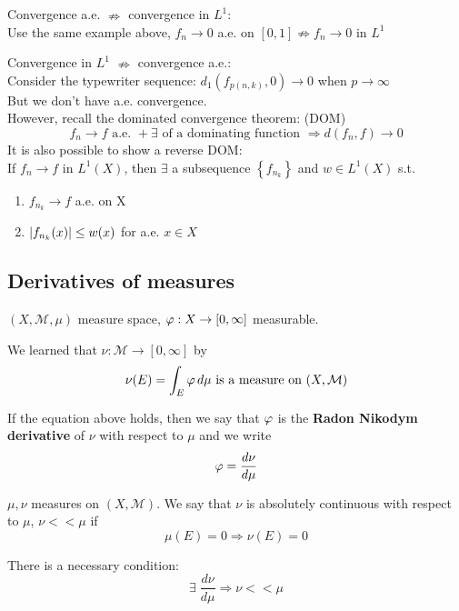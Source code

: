 Convergence a.e. \(\nRightarrow\) convergence in \(L^1\): \\
Use the same example above, \(f_n \rightarrow 0\) a.e. on \([0, 1] \nRightarrow f_n \rightarrow 0\) in \(L^1\)

Convergence in \(L^1\) \(\nRightarrow\) convergence a.e.: \\
Consider the typewriter sequence: \( d_1(f_{p(n, k)}, 0) \to 0\) when \( p \to\infty\) \\
But we don't have a.e. convergence. \\
However, recall the dominated convergence theorem: (DOM)
\[ 
    f_n \rightarrow f \text{ a.e. } + \exists \text{ of a dominating function } \Rightarrow d(f_n, f)\rightarrow 0 
\]
It is also possible to show a reverse DOM: \\
If \(f_n \to f \) in \(L^1(X)\), then \(\exists\) a subsequence \(\left\{f_{n_k}\right\}\) and \(w \in L^1(X)\) s.t. 
\begin{enumerate}
    \item \(f_{n_k} \rightarrow f\) a.e. on X
    \item \( \abs{f_{n_k}(x)} \leq w(x) \) for a.e. \(x \in X\)
\end{enumerate}

\subsection*{Derivatives of measures}
\(\left(X, \mathcal{M}, \mu \right)\) measure space,
\(\oldphi : X \to \left[0, \infty \right]\) measurable.  

We learned that \(\nu: \mathcal{M} \to \left[0, \infty \right]\) by 
\[
    \nu(E)= \int_E \oldphi \, d\mu \mbox{ is a measure on }(X, \mathcal{M})
\] 

If the equation above holds, then we say that \(\oldphi\) is the \textbf{Radon Nikodym derivative} of \(\nu\) with respect to \(\mu\) and we write 
\[
    \oldphi = \frac{d\nu}{d\mu}
\]
\begin{definition}
    \(\mu, \nu  \) measures on \(\left(X, \mathcal{M}\right)\). 
    We say that \(\nu\) is absolutely continuous with respect to \(\mu\), \(\nu << \mu \) if 
    \[
        \mu(E) = 0 \Rightarrow \nu(E)=0
    \]
\end{definition}

\begin{lemma}
    There is a necessary condition:
    \[ 
        \exists \; \frac{d \nu}{d \mu} \Rightarrow \nu << \mu 
    \]
\end{lemma}

